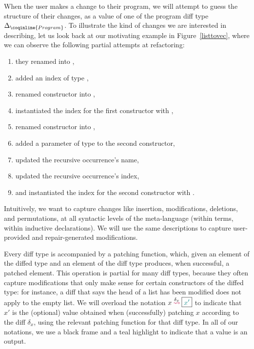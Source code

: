 When the user makes a change to their program, we will attempt to guess the
structure of their changes, as a value of one of the program diff type
$\Delta_{\coqinline{Program}}$.  To illustrate the kind of changes we are
interested in describing, let us look back at our motivating example in
Figure~\ref{listtovec}, where we can observe the following partial attempts at
refactoring:

\begin{enumerate}

\item they renamed  into ,

\item added an index of type ,

\item renamed constructor  into ,

\item instantiated the index for the first constructor with ,

\item renamed constructor  into ,

\item added a parameter  of type  to the second
  constructor,

\item updated the recursive occurrence's name,

\item updated the recursive occurrence's index,

\item and instantiated the index for the second constructor with .

\end{enumerate}

Intuitively, we want to capture changes like insertion, modifications,
deletions, and permutations, at all syntactic levels of the meta-language
(within terms, within inductive declarations).  We will use the same
descriptions to capture user-provided and repair-generated modifications.

Every diff type is accompanied by a patching function, which, given an element
of the diffed type and an element of the diff type produces, when successful, a
patched element.  This operation is partial for many diff types, because they
often capture modifications that only make sense for certain constructors of the
diffed type: for instance, a diff that says the head of a list has been modified
does not apply to the empty list.  We will overload the notation
$x \overset{\delta_x}{\mathbin{\textcolor{purple}{\rightsquigarrow}}} \boxed{ \textcolor{teal}{x'} }$ to indicate that $x'$ is the (optional) value
obtained when (successfully) patching $x$ according to the diff $\delta_x$,
using the relevant patching function for that diff type.  In all of our
notations, we use a black frame and a teal highlight to indicate that a value is
an output.

